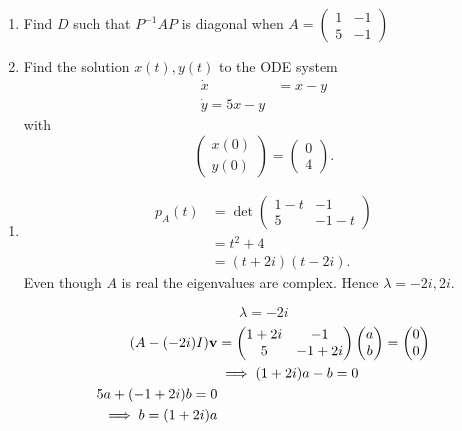 \documentclass[10pt, a4paper]{article}
\begin{document}
\begin{problem}\phantom{}
    \begin{enumerate}[label = (\alph*)]
        \item Find $D$ such that $P ^ {-1}AP$ is diagonal when $A = \begin{pmatrix}
            1 & -1 \\ 5 & -1
        \end{pmatrix}$

        \item Find the solution $x(t), y(t)$ to the ODE system
        \begin{align*}
            \dot{x} &= x - y \\
            \dot{y} = 5x - y
        \end{align*}
        with
        \[
        \begin{pmatrix}
            x(0) \\ y(0)
        \end{pmatrix} = \begin{pmatrix}
            0 \\ 4
        \end{pmatrix}.
        \]
    \end{enumerate}

    \begin{solution}\phantom{}
        \begin{enumerate}[label = (\alph*)]
            \item 
            \begin{align*}
                p_A(t) &= \det\begin{pmatrix}
                    1 - t & -1 \\ 5 & -1 - t
                \end{pmatrix} \\
                &= t ^ 2 + 4 \\
                &= (t + 2i)(t - 2i).
            \end{align*}
            Even though $A$ is real the eigenvalues are complex.
            Hence $\lambda = -2i, 2i$.
    
            \[
            \lambda = -2i
            \]
            \begin{align*}
                (A - (-2i)I)\mathbf{v} &= \begin{pmatrix}
                    1 + 2i & -1 \\ 5 & -1 + 2i
                \end{pmatrix}\begin{pmatrix}
                    a \\ b
                \end{pmatrix} = \begin{pmatrix}
                     0 \\ 0
                \end{pmatrix} \\
                &\implies
                (1 + 2i)a - b = 0 \\
                5a + (-1 + 2i)b = 0 \\
                \implies b = (1 + 2i)a
            \end{align*}
    

\end{enumerate}
\end{solution}
\end{problem}
\end{document}
